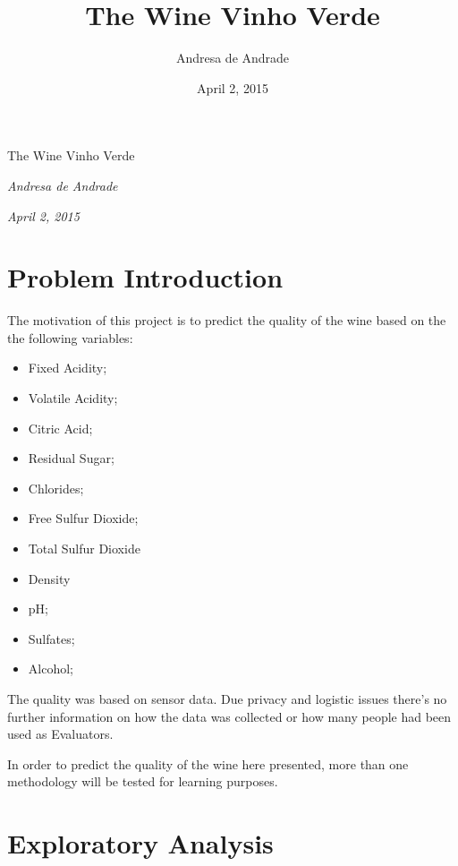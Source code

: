 \documentclass[]{article}
\title{The Wine Vinho Verde}
\author{Andresa de Andrade}
\date{April 2, 2015}
\begin{document}
\begin{center}
\huge The Wine Vinho Verde \\[0.2cm]
\end{center}
\begin{center}
\large \emph{Andresa de Andrade}\\[0.1cm]
\end{center}
\begin{center}
\large \emph{April 2, 2015} \\
\end{center}
\normalsize


{
\hypersetup{linkcolor=black}
\setcounter{tocdepth}{2}
\tableofcontents
}
\newpage 

\section{Problem Introduction}\label{problem-introduction}

The motivation of this project is to predict the quality of the wine
based on the the following variables:

\begin{itemize}
\itemsep1pt\parskip0pt
\item
  Fixed Acidity;
\item
  Volatile Acidity;
\item
  Citric Acid;
\item
  Residual Sugar;
\item
  Chlorides;
\item
  Free Sulfur Dioxide;
\item
  Total Sulfur Dioxide
\item
  Density
\item
  pH;
\item
  Sulfates;
\item
  Alcohol;
\end{itemize}

The quality was based on sensor data. Due privacy and logistic issues
there's no further information on how the data was collected or how many
people had been used as Evaluators.

In order to predict the quality of the wine here presented, more than
one methodology will be tested for learning purposes.

\section{Exploratory Analysis}\label{exploratory-analysis}
\end{document}
